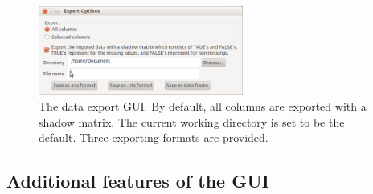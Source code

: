 \documentclass[article]{jss}
\begin{document}
\begin{center}
\begin{figure}[h]
\begin{centering}
\includegraphics[width=0.6\textwidth]{graph/fig7-export}
\par\end{centering}
\caption{The data export GUI. By default, all columns are exported with a shadow matrix. The current working directory is set to be the default. Three exporting formats are provided.}
\label{fig: export}
\end{figure}
\par\end{center}


\subsection{Additional features of the GUI}
\end{document}
